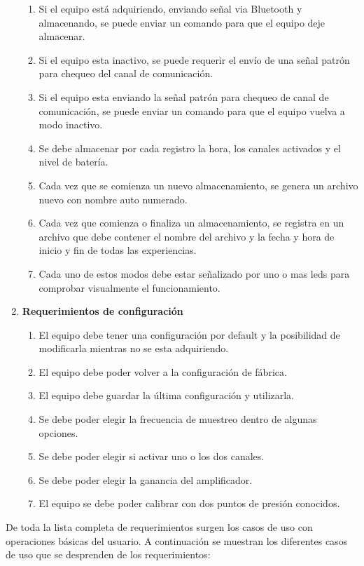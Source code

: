 \begin{enumerate}
\begin{enumerate}[label*=\arabic*.]
		\item Si el equipo está adquiriendo, enviando señal via Bluetooth y almacenando, se puede enviar un comando para que el equipo deje almacenar.
		\item Si el equipo esta inactivo, se puede requerir el envío de una señal patrón para chequeo del canal de comunicación.
		\item Si el equipo esta enviando la señal patrón para chequeo de canal de comunicación, se puede enviar un comando para que el equipo vuelva a modo inactivo.
		\item Se debe almacenar por cada registro la hora, los canales activados y el nivel de batería.
		\item Cada vez que se comienza un nuevo almacenamiento, se genera un archivo nuevo con nombre auto numerado.
		\item Cada vez que comienza o finaliza un almacenamiento, se registra en un archivo que debe contener el nombre del archivo y la fecha y hora de inicio y fin de todas las experiencias.
		\item Cada uno de estos modos debe estar señalizado por uno o mas leds para comprobar visualmente el funcionamiento.
	\end{enumerate}
	
	\item \textbf{Requerimientos de configuración}
	
	\begin{enumerate} [label*=\arabic*.]
		\item El equipo debe tener una configuración por default y la posibilidad de modificarla mientras no se esta adquiriendo.
		\item El equipo debe poder volver a la configuración de fábrica.
		\item El equipo debe guardar la última configuración y utilizarla.
		\item Se debe poder elegir la frecuencia de muestreo dentro de algunas opciones.
		\item Se debe poder elegir si activar uno o los dos canales.
		\item Se debe poder elegir la ganancia del amplificador.
		\item El equipo se debe poder calibrar con dos puntos de presión conocidos.		
	\end{enumerate}


\end{enumerate}


De toda la lista completa de requerimientos surgen los casos de uso con operaciones básicas del usuario. A continuación se muestran los diferentes casos de uso que se desprenden de los requerimientos:

